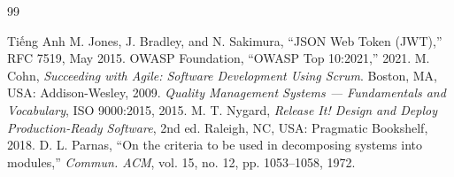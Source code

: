 \begin{thebibliography}{99}
\begin{bibsection}{Tiếng Anh}
	M. Jones, J. Bradley, and N. Sakimura, ``JSON Web Token (JWT),'' RFC 7519, May 2015.
	OWASP Foundation, ``OWASP Top 10:2021,'' 2021.
	M. Cohn, \textit{Succeeding with Agile: Software Development Using Scrum}. Boston, MA, USA: Addison-Wesley, 2009.
	\textit{Quality Management Systems --- Fundamentals and Vocabulary}, ISO 9000:2015, 2015.
	M. T. Nygard, \textit{Release It! Design and Deploy Production-Ready Software}, 2nd ed. Raleigh, NC, USA: Pragmatic Bookshelf, 2018.
	D. L. Parnas, ``On the criteria to be used in decomposing systems into modules,'' \textit{Commun. ACM}, vol. 15, no. 12, pp. 1053--1058, 1972.
\end{bibsection}
\end{thebibliography}

